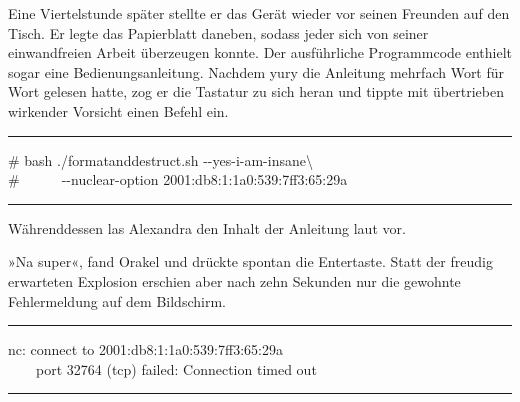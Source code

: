Eine Viertelstunde später stellte er das Gerät wieder vor seinen Freunden auf den Tisch. Er legte das Papierblatt daneben, sodass jeder sich von seiner einwandfreien Arbeit überzeugen konnte. Der ausführliche Programmcode enthielt sogar eine Bedienungsanleitung. Nachdem yury die Anleitung mehrfach Wort für Wort gelesen hatte, zog er die Tastatur zu sich heran und tippte mit übertrieben wirkender Vorsicht einen Befehl ein.

\noindent \parbox{\textwidth}{ \vspace{3ex} \hrule \vspace{3ex}

    \begin{footnotesize}
    \begin{ttfamily}

\noindent \# bash ./formatanddestruct.sh -{}-yes-i-am-insane\textbackslash\\
\noindent \#~~~~~~-{}-nuclear-option 2001:db8:1:1a0:539:7ff3:65:29a

    \end{ttfamily}
    \end{footnotesize}

\vspace{3ex} \hrule \vspace{3ex} }

Währenddessen las Alexandra den Inhalt der Anleitung laut vor.


»Na super«, fand Orakel und drückte spontan die Entertaste. Statt der freudig erwarteten Explosion erschien aber nach zehn Sekunden nur die gewohnte Fehlermeldung auf dem Bildschirm.

\noindent \parbox{\textwidth}{ \vspace{3ex} \hrule \vspace{3ex}

    \begin{footnotesize}
    \begin{ttfamily}

\noindent nc: connect to 2001:db8:1:1a0:539:7ff3:65:29a\\
\noindent ~~~~port 32764 (tcp) failed: Connection timed out

    \end{ttfamily}
    \end{footnotesize}

\vspace{3ex} \hrule \vspace{3ex} }

